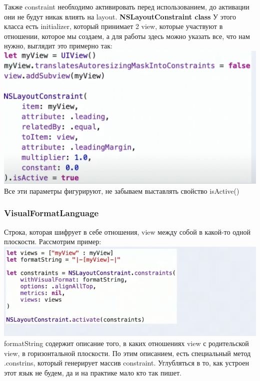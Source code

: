 \documentclass{article}
\begin{document}
    \newline
    Также constraint необходимо активировать перед использованием, до активации они не будут никак влиять на layout.
    \newline
    \textbf{NSLayoutConstraint class}
    \newline
    У этого класса есть initializer, который принимает 2 view, которые участвуют в отношении, которое мы создаем, а для работы здесь можно указать все, что нам нужно, выглядит это примерно так: 
    \newline
    \includegraphics[scale = 0.3]{pic/Снимок экрана 2023-07-31 в 21.58.30.png}
    \newline
    Все эти параметры фигурируют, не забываем выставлять свойство isActive()
    \subsubsection{VisualFormatLanguage}
    Строка, которая шифрует в себе отношения, view между собой в какой-то одной плоскости. Рассмотрим пример: 
    \newline
    \includegraphics[scale = 0.5]{pic/Снимок экрана 2023-07-31 в 22.10.02.png}
    \newline
    formatString  содержит описание того, в каких отношениях view с родительской view, в горизонтальной плоскости. По этим описанием, есть специальный метод .constrins, который генерирует массив constraint. 
    \newline
    Углубляться в то, как устроен этот язык не будем, да и на практике мало кто так пишет. 
\end{document}
